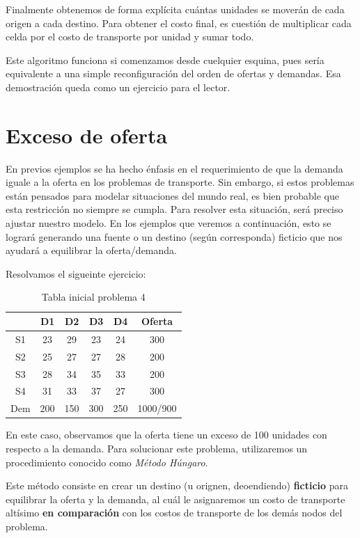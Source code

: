 \documentclass[12pt]{article}  %
\begin{document}
Finalmente obtenemos de forma explícita cuántas unidades se moverán de cada origen a cada destino. Para obtener el costo final, es cuestión de multiplicar cada celda por el costo de transporte por unidad y sumar todo.

Este algoritmo funciona si comenzamos desde cuelquier esquina, pues sería equivalente a una simple reconfiguración del orden de ofertas y demandas. Esa demostración queda como un ejercicio para el lector.

\section{Exceso de oferta}
En previos ejemplos se ha hecho énfasis en el requerimiento de que la demanda iguale a la oferta en los problemas de transporte. Sin embargo, si estos problemas están pensados para modelar situaciones del mundo real, es bien probable que esta restricción no siempre se cumpla. Para resolver esta situación, será preciso ajustar nuestro modelo. En los ejemplos que veremos a continuación, esto se logrará generando una fuente o un destino (según corresponda) ficticio que nos ayudará a equilibrar la oferta/demanda.

Resolvamos el sigueinte ejercicio:

\begin{table}[H]
\centering
\caption{Tabla inicial problema 4}
\label{tab:Prob4}
\begin{tabular}{c|cccc|c}
& D1 & D2 & D3 & D4 & Oferta \\
\hline
S1 & 23 & 29 & 23 & 24 & 300 \\
S2 & 25 & 27 & 27 & 28 & 200 \\
S3 & 28 & 34 & 35 & 33 & 200 \\
S4 & 31 & 33 & 37 & 27 & 300 \\
\hline
Dem & 200 & 150 & 300 & 250 & \mbox{1000/900} 
\end{tabular}
\end{table}

En este caso, observamos que la oferta tiene un exceso de 100 unidades con respecto a la demanda. Para solucionar este problema, utilizaremos un procedimiento conocido como \textit{Método Húngaro}.

Este método consiste en crear un destino (u orignen, deoendiendo) \textbf{ficticio} para equilibrar la oferta y la demanda, al cuál le asignaremos un costo de transporte altísimo \textbf{en comparación} con los costos de transporte de los demás nodos del problema.
\end{document}
